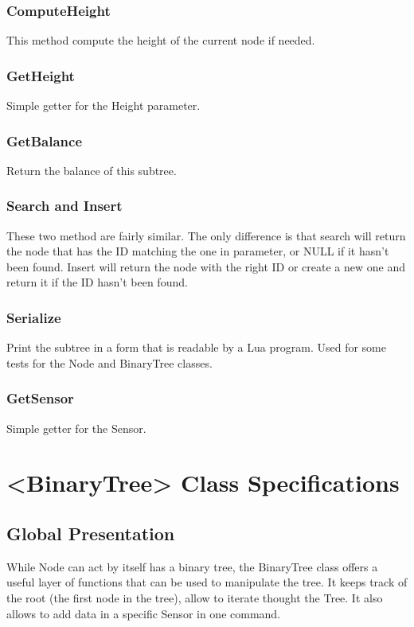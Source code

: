 \documentclass[10pt]{article}
\begin{document}
\subsubsection*{ComputeHeight}
This method compute the height of the current node if needed.

\subsubsection*{GetHeight}
Simple getter for the Height parameter.

\subsubsection*{GetBalance}
Return the balance of this subtree.

\subsubsection*{Search and Insert}
These two method are fairly similar. The only difference is that search will return the node that has the ID matching the one in parameter, or NULL if it hasn't been found. Insert will return the node with the right ID or create a new one and return it if the ID hasn't been found.

\subsubsection*{Serialize}
Print the subtree in a form that is readable by a Lua program. Used for some tests for the Node and BinaryTree classes.

\subsubsection*{GetSensor}
Simple getter for the Sensor.

\section{<BinaryTree> Class Specifications}
\subsection{Global Presentation}
While Node can act by itself has a binary tree, the BinaryTree class offers a useful layer of functions that can be used to manipulate the tree. It keeps track of the root (the first node in the tree), allow to iterate thought the Tree. It also allows to add data in a specific Sensor in one command.
\end{document}
